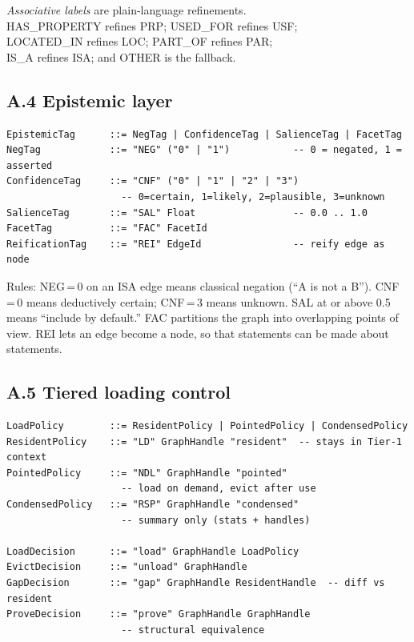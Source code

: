 \textit{Associative labels} are plain-language refinements.\\ HAS\_PROPERTY refines PRP; USED\_FOR refines USF;\\ LOCATED\_IN refines LOC; PART\_OF refines PAR;\\ IS\_A refines ISA; and OTHER is the fallback.

\subsection*{A.4 Epistemic layer}

\begin{verbatim}
EpistemicTag      ::= NegTag | ConfidenceTag | SalienceTag | FacetTag
NegTag            ::= "NEG" ("0" | "1")           -- 0 = negated, 1 = asserted
ConfidenceTag     ::= "CNF" ("0" | "1" | "2" | "3")
                    -- 0=certain, 1=likely, 2=plausible, 3=unknown
SalienceTag       ::= "SAL" Float                 -- 0.0 .. 1.0
FacetTag          ::= "FAC" FacetId
ReificationTag    ::= "REI" EdgeId                -- reify edge as node
\end{verbatim}

Rules: NEG\,=\,0 on an ISA edge means classical negation (``A is not a B''). CNF\,=\,0 means deductively certain; CNF\,=\,3 means unknown. SAL at or above 0.5 means ``include by default.'' FAC partitions the graph into overlapping points of view. REI lets an edge become a node, so that statements can be made about statements.

\subsection*{A.5 Tiered loading control}

\begin{verbatim}
LoadPolicy        ::= ResidentPolicy | PointedPolicy | CondensedPolicy
ResidentPolicy    ::= "LD" GraphHandle "resident"  -- stays in Tier-1 context
PointedPolicy     ::= "NDL" GraphHandle "pointed"
                    -- load on demand, evict after use
CondensedPolicy   ::= "RSP" GraphHandle "condensed"
                    -- summary only (stats + handles)

LoadDecision      ::= "load" GraphHandle LoadPolicy
EvictDecision     ::= "unload" GraphHandle
GapDecision       ::= "gap" GraphHandle ResidentHandle  -- diff vs resident
ProveDecision     ::= "prove" GraphHandle GraphHandle
                    -- structural equivalence
\end{verbatim}

